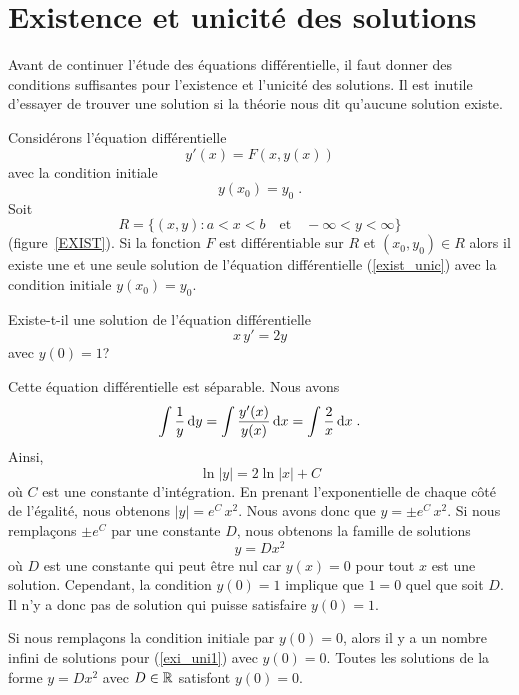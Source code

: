 {\section{Existence et unicité des solutions  \theory}\label{ODEexistsol}

Avant de continuer l'étude des équations différentielle, il faut
donner des conditions suffisantes pour l'existence et l'unicité des
solutions.  Il est inutile d'essayer de trouver une solution si la
théorie nous dit qu'aucune solution existe.

\begin{focus}{\thm}
Considérons l'équation différentielle
\begin{equation}\label{exist_unic}
y'(x) = F(x,y(x))
\end{equation}
avec la condition initiale
\[
y(x_0) = y_0 \; .
\]
Soit
\[
R = \{ (x,y) : a < x < b \quad \text{et}\quad -\infty < y < \infty \}
\]
(figure~\ref{EXIST}).  Si la fonction
$F$ est différentiable sur $R$ et $(x_0,y_0) \in R$ alors il existe
une et une seule solution de l'équation différentielle
(\ref{exist_unic}) avec la condition initiale $y(x_0)=y_0$.
\end{focus}


\begin{egg}
Existe-t-il une solution de l'équation différentielle
\begin{equation}\label{exi_uni1}
x\, y'= 2 y
\end{equation}
avec $y(0)=1$?

Cette équation différentielle est séparable.  Nous avons
\[
\int \frac{1}{y} \,\mathrm{d}y = \int \frac{y'(x)}{y(x)} \,\mathrm{d}x
= \int \frac{2}{x} \,\mathrm{d}x \; .
\]
Ainsi,
\[
\ln|y| = 2\ln|x| + C
\]
où $C$ est une constante d'intégration.  En prenant l'exponentielle de
chaque côté de l'égalité, nous obtenons $|y| = e^C \,x^2$.  Nous avons donc que
$y = \pm e^C \, x^2$.  Si nous remplaçons $\pm e^C$ par une constante
$D$, nous obtenons la famille de solutions  
\[
y = Dx^2
\]
où $D$ est une constante qui peut être nul car $y(x)=0$ pour tout $x$
est une solution.  Cependant, la condition $y(0)=1$ implique
que $1 = 0$ quel que soit $D$.  Il n'y a donc pas de solution qui
puisse satisfaire $y(0)=1$.

Si nous remplaçons la condition initiale par $y(0)=0$, alors il y a
un nombre infini de solutions pour (\ref{exi_uni1}) avec $y(0)=0$.  Toutes les
solutions de la forme $y=Dx^2$ avec $D\in \mathbb{R}$ satisfont $y(0)=0$.


\end{egg}}
